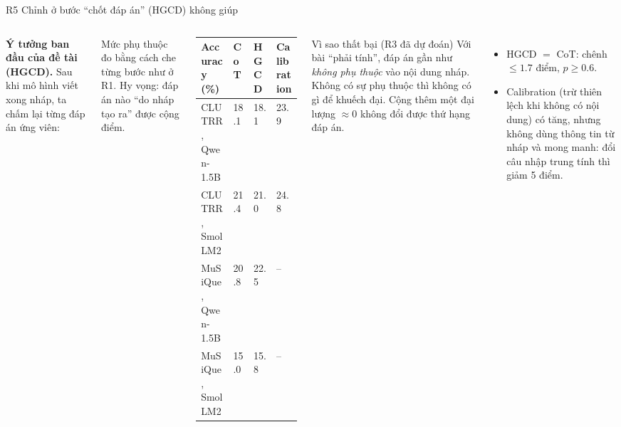 \documentclass[aspectratio=169,t]{beamer}
\begin{document}
\begin{frame}[shrink]{R5 \textperiodcentered{} Chỉnh ở bước ``chốt đáp án'' (HGCD) không giúp}
\begin{columns}[T,onlytextwidth]
\footnotesize
\textbf{Ý tưởng ban đầu của đề tài (HGCD).} Sau khi mô hình viết xong nháp, ta chấm lại từng đáp án ứng viên:\par\vspace{2pt}
\centering\scriptsize
{}\par\vspace{3pt}
\raggedright
Mức phụ thuộc đo bằng cách che từng bước như ở R1. Hy vọng: đáp án nào ``do nháp tạo ra'' được cộng điểm.\par\vspace{4pt}
\renewcommand{\arraystretch}{1.15}
\begin{tabularx}{\linewidth}{@{}YQ{0.8cm}Q{0.9cm}Q{1.35cm}@{}}
\toprule
\textbf{Accuracy (\%)} & \textbf{CoT} & \textbf{HGCD} & \textbf{Calibration}\\
\midrule
CLUTRR, Qwen-1.5B & 18.1 & 18.1 & 23.9\\
CLUTRR, SmolLM2 & 21.4 & 21.0 & 24.8\\
MuSiQue, Qwen-1.5B & 20.8 & 22.5 & --\\
MuSiQue, SmolLM2 & 15.0 & 15.8 & --\\
\bottomrule
\end{tabularx}
\begin{block}{Vì sao thất bại (R3 đã dự đoán)}
\scriptsize
Với bài ``phải tính'', đáp án gần như \emph{không phụ thuộc} vào nội dung nháp. Không có sự phụ thuộc thì không có gì để khuếch đại. Cộng thêm một đại lượng $\approx 0$ không đổi được thứ hạng đáp án.
\end{block}
\begin{itemize}
  \setlength{\itemsep}{2pt}
  \scriptsize
  \item HGCD $=$ CoT: chênh $\le 1.7$ điểm, $p\ge 0.6$.
  \item Calibration (trừ thiên lệch khi không có nội dung) có tăng, nhưng không dùng thông tin từ nháp và mong manh: đổi câu nhập trung tính thì giảm 5 điểm.
\end{itemize}
\end{columns}
\par\kern0pt
\end{frame}
\end{document}
